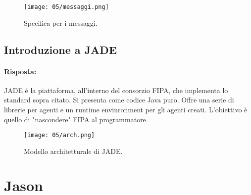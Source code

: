 
\begin{figure}[!h]
    \centering
    \texttt{[image: 05/messaggi.png]}
  \caption{Specifica per i messaggi.}
\end{figure}

\subsection{Introduzione a JADE}


\paragraph{Risposta:} JADE è la piattaforma, all'interno del consorzio FIPA, che implementa lo standard sopra citato. Si presenta come codice Java puro. Offre una serie di librerie per agenti e un runtime envinronment per gli agenti creati. L'obiettivo è quello di "nascondere" FIPA al programmatore. 

\begin{figure}[!h]
    \centering
    \texttt{[image: 05/arch.png]}
  \caption{Modello architetturale di JADE.}
\end{figure}


\section{Jason}
